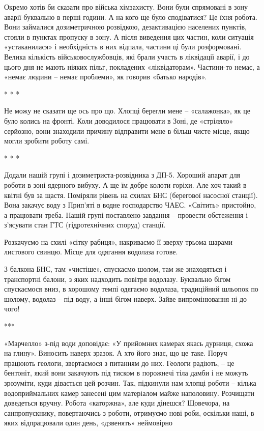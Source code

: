 Окремо хотів би сказати про війська хімзахисту. Вони були спрямовані в зону
аварії буквально в перші години. А на кого ще було сподіватися? Це їхня робота.
Вони займалися дозиметричною розвідкою, дезактивацією населених пунктів, стояли
в пунктах пропуску в зону. А після виведення цих частин, коли ситуація
«устаканилася» і необхідність в них відпала, частини ці були розформовані.
Велика кількість військовослужбовців, які брали участь в ліквідації аварії, і
до цього дня не мають ніяких пільг, покладених «ліквідаторам». Частини-то
немає, а «немає людини – немає проблеми», як говорив «батько народів».

* * *

Не можу не сказати ще ось про що. Хлопці берегли мене – «салажонка», як це було
колись на фронті. Коли доводилося працювати в Зоні, де «стріляло» серйозно,
вони знаходили причину відправити мене в більш чисте місце, якщо могли зробити
роботу самі.

* * *

Додали нашій групі і дозиметриста-розвідника з ДП-5. Хороший апарат для роботи
в зоні ядерного вибуху. А ще їм добре колоти горіхи. Але хоч такий в квітні був
за щастя. Поміряли рівень на схилах БНС (берегової насосної станції). Вона
закачує воду з Прип'яті в водне господарство ЧАЕС. «Світить» пристойно, а
працювати треба. Нашій групі поставлено завдання – провести обстеження і
з'ясувати стан ГТС (гідротехнічних споруд) станції.

Розкачуємо на схилі «сітку рабиця», накриваємо її зверху трьома шарами
листового свинцю. Місце для одягання водолаза готове.

З балкона БНС, там «чистіше», спускаємо шолом, там же знаходяться і транспортні
балони, з яких надходить повітря водолазу. Буквально бігом спускаємося вниз, в
хорошому темпі одягаємо водолаза, традиційний шльопок по шолому, водолаз – під
воду, а інші бігом наверх. Зайве випромінювання ні до чого!

***

«Марчелло» з-під води доповідає: «У прийомних камерах якась дурниця, схожа на
глину». Виносить наверх зразок. А хто його знає, що це таке. Поруч працюють
геологи, звертаємося з питанням до них. Геологи радіють, – це бентоніт, який
вони закачують під тиском в порожнечі тіла дамби і не можуть зрозуміти, куди
дівається цей розчин. Так, підкинули нам хлопці роботи – кілька водоприймальних
камер занесені цим матеріалом майже наполовину. Розчищати доведеться вручну.
Робота «каторжна», але куди дінешся? Щовечора, на санпропускнику, повертаючись
з роботи, отримуємо нові роби, оскільки наші, в яких відпрацювали один день,
«дзвенять» неймовірно

